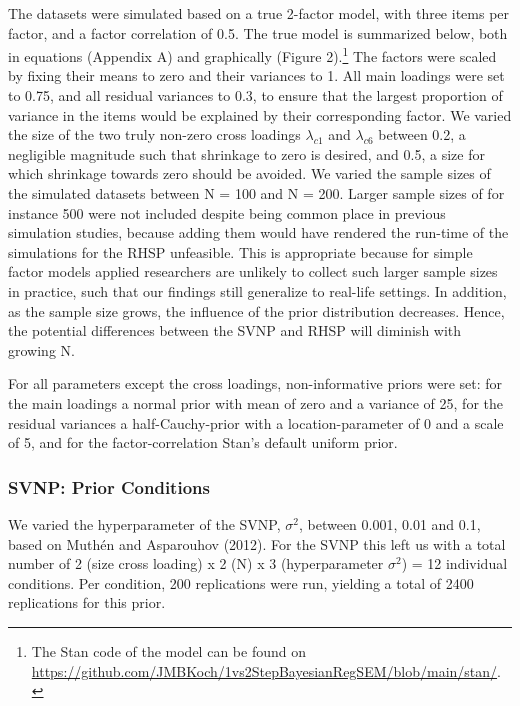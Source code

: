 \documentclass[
  man, donotrepeattitle,floatsintext]{apa6}
\begin{document}
The datasets were simulated based on a true 2-factor model, with three
items per factor, and a factor correlation of 0.5. The true model is
summarized below, both in equations (Appendix A) and graphically (Figure
2).\footnote{The Stan code of the model can be found on
  \url{https://github.com/JMBKoch/1vs2StepBayesianRegSEM/blob/main/stan/}.} The factors were scaled by fixing their means to zero and their
variances to 1. All main loadings were set to 0.75, and all residual
variances to 0.3, to ensure that the largest proportion of variance in
the items would be explained by their corresponding factor. We varied
the size of the two truly non-zero cross loadings \(\lambda_{c 1}\) and
\(\lambda_{c 6}\) between 0.2, a negligible magnitude such that shrinkage
to zero is desired, and 0.5, a size for which shrinkage towards zero
should be avoided. We varied the sample sizes of the simulated datasets
between N = 100 and N = 200. Larger sample sizes of for instance 500
were not included despite being common place in previous simulation
studies, because adding them would have rendered the run-time of the
simulations for the RHSP unfeasible. This is appropriate because for
simple factor models applied researchers are unlikely to collect such
larger sample sizes in practice, such that our findings still generalize
to real-life settings. In addition, as the sample size grows, the
influence of the prior distribution decreases. Hence, the potential
differences between the SVNP and RHSP will diminish with growing N.

For all parameters except the cross loadings, non-informative priors
were set: for the main loadings a normal prior with mean of zero and a
variance of 25, for the residual variances a half-Cauchy-prior with a
location-parameter of 0 and a scale of 5, and for the factor-correlation
Stan's default uniform prior.

\hypertarget{svnp-prior-conditions}{%
\subsubsection{SVNP: Prior Conditions}\label{svnp-prior-conditions}}

We varied the hyperparameter of the SVNP, \(\sigma^2\), between 0.001,
0.01 and 0.1, based on Muthén and Asparouhov (2012). For the SVNP this left us
with a total number of 2 (size cross loading) x 2 (N) x 3
(hyperparameter \(\sigma^2\)) = 12 individual conditions. Per condition,
200 replications were run, yielding a total of 2400 replications for
this prior.
\end{document}
